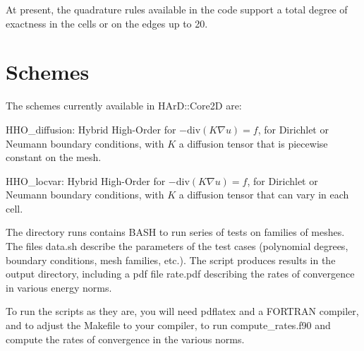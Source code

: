 At present, the quadrature rules available in the code support a total degree of exactness in the cells or on the edges up to 20.

\label{_schemes}%
 \hypertarget{index_schemes}{}\section{Schemes}\label{index_schemes}
The schemes currently available in H\+Ar\+D\+::\+Core2D are\+:


\begin{DoxyItemize}
\item H\+H\+O\+\_\+diffusion\+: Hybrid High-\/\+Order for $-\mathrm{div}(K\nabla u)=f$, for Dirichlet or Neumann boundary conditions, with $K$ a diffusion tensor that is piecewise constant on the mesh.
\item H\+H\+O\+\_\+locvar\+: Hybrid High-\/\+Order for $-\mathrm{div}(K\nabla u)=f$, for Dirichlet or Neumann boundary conditions, with $K$ a diffusion tensor that can vary in each cell.
\end{DoxyItemize}

The directory {\ttfamily runs} contains B\+A\+SH to run series of tests on families of meshes. The files {\ttfamily data.\+sh} describe the parameters of the test cases (polynomial degrees, boundary conditions, mesh families, etc.). The script produces results in the {\ttfamily output} directory, including a pdf file {\ttfamily rate.\+pdf} describing the rates of convergence in various energy norms.

To run the scripts as they are, you will need {\ttfamily pdflatex} and a F\+O\+R\+T\+R\+AN compiler, and to adjust the {\ttfamily Makefile} to your compiler, to run {\ttfamily compute\+\_\+rates.\+f90} and compute the rates of convergence in the various norms. 
